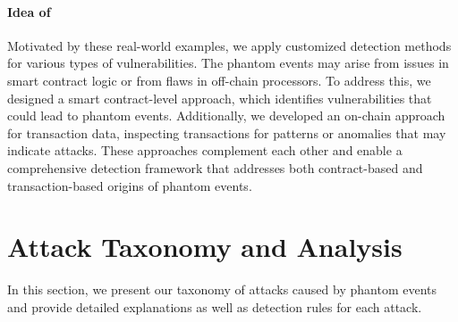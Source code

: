 \paragraph{Idea of \tool}
Motivated by these real-world examples, we apply customized detection methods for various types of
vulnerabilities.
The phantom events may arise from issues in smart contract logic or from flaws in off-chain
processors.
To address this, we designed a smart contract-level approach, which identifies vulnerabilities that
could lead to phantom events.
Additionally, we developed an on-chain approach for transaction data, inspecting transactions for
patterns or anomalies that may indicate attacks.
These approaches complement each other and enable a comprehensive detection framework that
addresses both contract-based and transaction-based origins of phantom events.


\section{Attack Taxonomy and Analysis}\label{sec:vector}

In this section, we present our taxonomy of attacks caused by phantom events and provide detailed
explanations as well as detection rules for each attack.

